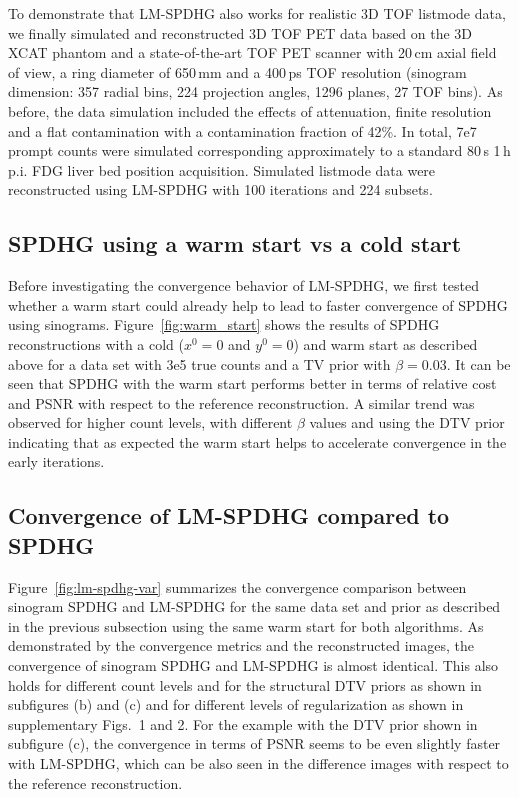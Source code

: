 To demonstrate that LM-SPDHG also works for realistic 3D TOF listmode data,
we finally simulated and reconstructed 3D TOF PET data based on the 3D XCAT \cite{Segars2010} phantom 
and a state-of-the-art
TOF PET scanner with 20\,cm axial field of view, a ring diameter of 650\,mm and a 400\,ps TOF 
resolution (sinogram dimension: 357 radial bins, 224 projection angles, 1296 planes, 27 TOF bins).
As before, the data simulation included the effects of attenuation, finite resolution and a
flat contamination with a contamination fraction of 42\%.
In total, 7e7 prompt counts were simulated corresponding approximately to a standard 
80\,s 1\,h p.i. FDG liver bed position acquisition.
Simulated listmode data were reconstructed using LM-SPDHG with 100 iterations and 224 subsets. 

\subsection*{SPDHG using a warm start vs a cold start}

Before investigating the convergence behavior of LM-SPDHG, we first tested whether 
a warm start could already help to lead to faster convergence of SPDHG using sinograms.
Figure~\ref{fig:warm_start} shows the results of SPDHG reconstructions with a cold 
($x^0 = 0$ and $y^0 = 0$) and warm start as described above for a data set with 3e5 true counts
and a TV prior with $\beta = 0.03$.
It can be seen that SPDHG with the warm start performs better in terms of relative cost
and PSNR with respect to the reference reconstruction.
A similar trend was observed for higher count levels, with different $\beta$ values and using
the DTV prior indicating that as expected the warm start helps to accelerate convergence
in the early iterations.

\subsection*{Convergence of LM-SPDHG compared to SPDHG}

Figure~\ref{fig:lm-spdhg-var} summarizes the convergence comparison between sinogram SPDHG and 
LM-SPDHG for the same data set and prior as described in the previous subsection using the 
same warm start for both algorithms.
As demonstrated by the convergence metrics and the reconstructed images, the convergence of
sinogram SPDHG and LM-SPDHG is almost identical.
This also holds for different count levels and for the structural DTV priors 
as shown in subfigures (b) and (c) and for different levels of regularization as shown
in supplementary Figs.~1 and 2.
For the example with the DTV prior shown in subfigure (c), the convergence in terms of
PSNR seems to be even slightly faster with LM-SPDHG, which can be also
seen in the difference images with respect to the reference reconstruction.

